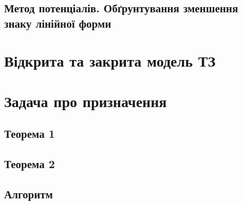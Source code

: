 \documentclass[12pt,a4paper]{book}
\begin{document}
\subsection{Метод потенціалів. Обґрунтування зменшення знаку лінійної форми}
\section{Відкрита та закрита модель ТЗ}
\section{Задача про призначення}
\subsection{Теорема 1}
\subsection{Теорема 2}
\subsection{Алгоритм}
\end{document}
